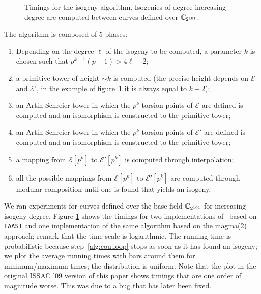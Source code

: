 \begin{figure}
  \centering

  \caption{Timings for the isogeny algorithm. Isogenies of degree
    increasing degree are computed between curves defined over
    $\mathbb{C}_{2^{101}}$.}
  \label{fig:couveignes}
\end{figure}

The algorithm is composed of 5 phases:
\begin{enumerate}
\item Depending on the degree $\ell$ of the isogeny to be computed, a
  parameter $k$ is chosen such that $p^{k-1}(p-1)>4\ell-2$;
\item\label{alg:cou:pri} a primitive tower of height $\sim k$ is
  computed (the precise height depends on $\mathscr{E}$ and
  $\mathscr{E'}$, in the example of figure~\ref{fig:couveignes} it is
  always equal to $k-2$);
\item\label{alg:cou:E} an Artin-Schreier tower in which the
  $p^k$-torsion points of $\mathscr{E}$ are defined is computed and an
  isomorphism is constructed to the primitive tower;
\item\label{alg:cou:E'} an Artin-Schreier tower in which the
  $p^k$-torsion points of $\mathscr{E'}$ are defined is computed and
  an isomorphism is constructed to the primitive tower;
\item\label{alg:cou:int} a mapping from $\mathscr{E}[p^k]$ to
  $\mathscr{E'}[p^k]$ is computed through interpolation;
\item\label{alg:cou:loop} all the possible mappings from
  $\mathscr{E}[p^k]$ to $\mathscr{E'}[p^k]$ are computed through
  modular composition until one is found that yields an isogeny.
\end{enumerate}

We ran experiments for curves defined over the base field
$\mathbb{C}_{2^{101}}$ for increasing isogeny degree. Figure
\ref{fig:couveignes} shows the timings for two implementations
of~\cite{DeFeo10} based on \texttt{FAAST} and one implementation of
the same algorithm based on the magma(2) approach; remark that the
time scale is logarithmic. The running time is probabilistic because
step~\ref{alg:cou:loop} stops as soon as it has found an isogeny; we
plot the average running times with bars around them for
minimum/maximum times; the distribution is uniform. Note that the plot
in the original ISSAC '09 version of this paper shows timings that are
one order of magnitude worse. This was due to a bug that has later
been fixed.

